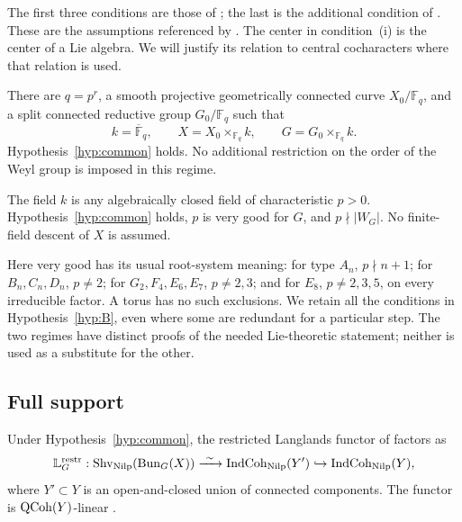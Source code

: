 The first three conditions are those of \cite[\S14.4.1]{AGKRRV}; the
last is the additional condition of \cite[\S D.1.1]{AGKRRV}.
These are the assumptions referenced by \cite[\S0.1.9]{GR}.
The center in condition~(i) is the center of a Lie algebra. We will
justify its relation to central cocharacters where that relation is used.

\begin{hypothesis}\label{hyp:A}
There are $q=p^r$, a smooth projective geometrically connected curve
$X_0/\mathbb F_q$, and a split connected reductive group
$G_0/\mathbb F_q$ such that
\[
 k=\overline{\mathbb F}_q,\qquad
 X=X_0\times_{\mathbb F_q}k,\qquad
 G=G_0\times_{\mathbb F_q}k.
\]
Hypothesis~\ref{hyp:common} holds. No additional restriction on the
order of the Weyl group is imposed in this regime.
\end{hypothesis}

\begin{hypothesis}
\label{hyp:B}
The field $k$ is any algebraically closed field of characteristic $p>0$.
Hypothesis~\ref{hyp:common} holds, $p$ is very good for $G$, and
$p\nmid |W_G|$. No finite-field descent of $X$ is assumed.
\end{hypothesis}

Here very good has its usual root-system meaning: for type $A_n$,
$p\nmid n+1$; for $B_n,C_n,D_n$, $p\ne2$; for
$G_2,F_4,E_6,E_7$, $p\ne2,3$; and for $E_8$, $p\ne2,3,5$,
on every irreducible factor. A torus has no such exclusions.
We retain all the conditions in Hypothesis~\ref{hyp:B}, even where
some are redundant for a particular step. The two regimes have distinct
proofs of the needed Lie-theoretic statement; neither is used as a
substitute for the other.

\subsection{Full support}

Under Hypothesis~\ref{hyp:common}, the restricted Langlands functor
of \cite{GR} factors as
\begin{equation}\label{intro:primed}
 \mathbb L_G^{\mathrm{restr}}:
 \operatorname{Shv}_{\operatorname{Nilp}}(\operatorname{Bun}_G(X))
 \xrightarrow{\ \sim\ }\operatorname{IndCoh}_{\operatorname{Nilp}}(Y')
 \hookrightarrow\operatorname{IndCoh}_{\operatorname{Nilp}}(Y),
\end{equation}
where $Y'\subset Y$ is an open-and-closed union of connected
components. The functor is $\operatorname{QCoh}(Y)$-linear
\cite[Lemma~1.3.7 and Main Theorem~1.3.9]{GR}.

